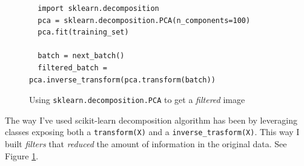 \begin{figure}
  \begin{verbatim}
  import sklearn.decomposition
  pca = sklearn.decomposition.PCA(n_components=100)
  pca.fit(training_set)

  batch = next_batch()
  filtered_batch = pca.inverse_transform(pca.transform(batch))
  \end{verbatim}
  \caption{Using \texttt{sklearn.decomposition.PCA} to get a
    \emph{filtered} image}
  \label{fig:transform-inverse_transform}
\end{figure}

The way I've used scikit-learn decomposition algorithm has been by
leveraging classes exposing both a \texttt{transform(X)} and a
\texttt{inverse\_trasform(X)}. This way I built \emph{filters} that
\emph{reduced} the amount of information in the original data. See
Figure \ref{fig:transform-inverse_transform}.
